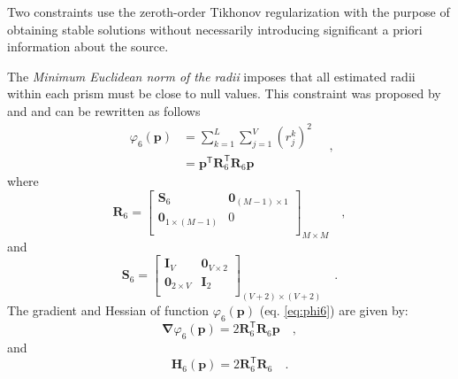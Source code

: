 Two constraints use the zeroth-order Tikhonov regularization with the purpose of obtaining stable solutions without necessarily introducing significant a priori information about the source. 

The \textit{Minimum Euclidean norm of the radii} imposes that 
all estimated radii within each prism must be close to null values. This constraint was proposed by \cite{oliveirajr-etal2011} and \cite{oliveirajr-barbosa2013} and can be rewritten as follows
\begin{equation}\label{eq:phi6}
\begin{split}
\varphi_{6}(\mathbf{p}) &= \sum\limits^{L}_{k=1}\sum\limits^{V}_{j=1}\left(r_{j}^{k}\right)^2 \\
&= \mathbf{p}^{\mathsf{T}} \mathbf{R}_{6}^{\mathsf{T}} \mathbf{R}_{6} \mathbf{p}
\end{split} \quad ,
\end{equation}
where
\begin{equation}
\mathbf{R}_{6} = 
\begin{bmatrix}
\mathbf{S}_{6} & \mathbf{0}_{(M-1) \times 1} \\
\mathbf{0}_{1 \times (M-1)} & 0 \\
\end{bmatrix}_{M\times M} \quad ,
\label{eq:R6-matrix}
\end{equation}
and 
\begin{equation}
\mathbf{S}_{6} = 
\begin{bmatrix}
\mathbf{I}_{V} & \mathbf{0}_{V \times 2} \\
\mathbf{0}_{2 \times V} & \mathbf{I}_{2} \\
\end{bmatrix}_{ (V+2)\times (V+2)} \quad .
\label{eq:S6-matrix}
\end{equation}
The gradient and Hessian of function $\varphi_{6}(\mathbf{p})$ (eq. \ref{eq:phi6}) are given by:
\begin{equation}\label{eq:phi6_grad}
\boldsymbol{\nabla}\varphi_{6}(\mathbf{p}) = 2 \mathbf{R}_{6}^{\mathsf{T}} \mathbf{R}_{6} \mathbf{p} \quad ,
\end{equation}
and
\begin{equation}\label{eq:phi6_hessian}
\mathbf{H}_{6}(\mathbf{p}) = 2 \mathbf{R}^{\mathsf{T}}_{6}\mathbf{R}_{6} \quad .
\end{equation}

